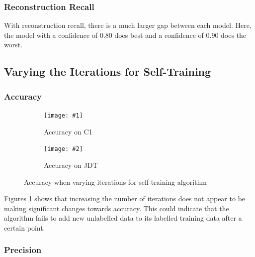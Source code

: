 \documentclass[../main.tex]{subfiles}
\begin{document}
\subsubsection{Reconstruction Recall}


With reconstruction recall, there is a much larger gap between each model. Here, the model with a confidence of 0.80 does best and a confidence of 0.90 does the worst. 

\subsection{Varying the Iterations for Self-Training}

\newcommand{\rqgraphsIter}[4]{
    \begin{figure}[H]
        \centering
        \begin{subfigure}[b]{0.75\textwidth}
            \texttt{[image: \#1]}
            \caption{#3 on C1}
            \label{fig:#4}
        \end{subfigure}
        
        \begin{subfigure}[b]{0.75\textwidth}
            \texttt{[image: \#2]}
            \caption{#3 on JDT}
            \label{fig:#4JDT}
        \end{subfigure}
    
        \caption{#3 when varying iterations for self-training algorithm}
        \label{fig:#4Both}
    \end{figure}
}


\subsubsection{Accuracy}

\rqgraphsIter{images/Results/RQ1/Exp3/Myling/acc.png}{images/Results/RQ1/Exp3/JDT/acc.png}{Accuracy}{rq1exp3Accuracy}

Figures \ref{fig:rq1exp3Accuracy} shows that increasing the number of iterations does not appear to be making significant changes towards accuracy. This could indicate that the algorithm fails to add new unlabelled data to its labelled training data after a certain point. 


\subsubsection{Precision}
\end{document}
